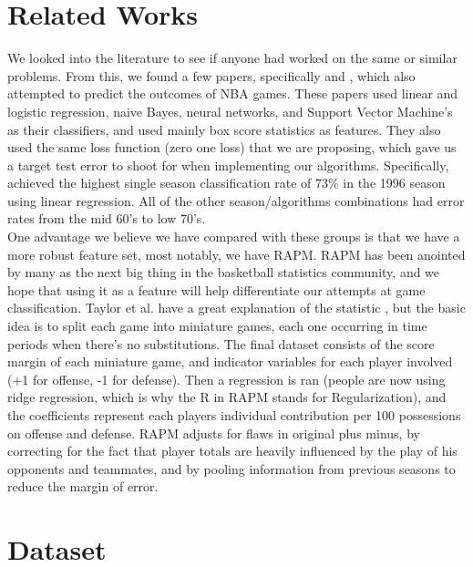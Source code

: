 \documentclass{article} %
\begin{document}
\section{Related Works}
	We looked into the literature to see if anyone had worked on the same or similar problems. From this, we found a few papers, specifically \cite{nba_oracle} and \cite{data_mining}, which also attempted to predict the outcomes of NBA games. These papers used linear and logistic regression, naive Bayes, neural networks, and Support Vector Machine's as their classifiers, and used mainly box score statistics as features. They also used the same loss function (zero one loss) that we are proposing, which gave us a target test error to shoot for when implementing our algorithms. Specifically, \cite{nba_oracle} achieved the highest single season classification rate of 73\% in the 1996 season using linear regression. All of the other season/algorithms combinations had error rates from the mid 60's to low 70's. \\

	One advantage we believe we have compared with these groups is that we have a more robust feature set, most notably, we have RAPM. RAPM has been anointed by many as the next big thing \cite{bigrpm} in the basketball statistics community, and we hope that using it as a feature will help differentiate our attempts at game classification. Taylor et al. have a great explanation of the statistic \cite{rpm}, but the basic idea is to split each game into miniature games, each one occurring in time periods when there's no substitutions. The final dataset consists of the score margin of each miniature game, and indicator variables for each player involved (+1 for offense, -1 for defense). Then a regression is ran (people are now using ridge regression, which is why the R in RAPM stands for Regularization), and the coefficients represent each players individual contribution per 100 possessions on offense and defense. RAPM adjusts for flaws in original plus minus, by correcting for the fact that player totals are heavily influenced by the play of his opponents and teammates, and by pooling information from previous seasons to reduce the margin of error. 

\section{Dataset}
\end{document}

